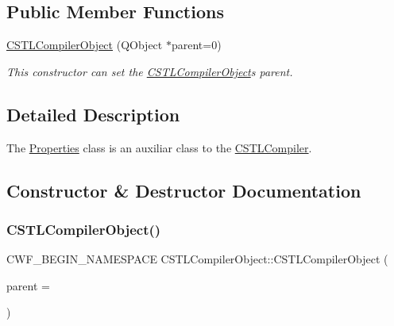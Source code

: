 \subsection*{Public Member Functions}
\begin{DoxyCompactItemize}
\item 
\mbox{\hyperlink{class_c_s_t_l_compiler_object_a31f110c6081112d484a85348520b0678}{C\+S\+T\+L\+Compiler\+Object}} (Q\+Object $\ast$parent=0)
\begin{DoxyCompactList}\small\item\em This constructor can set the \mbox{\hyperlink{class_c_s_t_l_compiler_object}{C\+S\+T\+L\+Compiler\+Object}}\textquotesingle{}s parent. \end{DoxyCompactList}\end{DoxyCompactItemize}


\subsection{Detailed Description}
The \mbox{\hyperlink{class_properties}{Properties}} class is an auxiliar class to the \mbox{\hyperlink{class_c_s_t_l_compiler}{C\+S\+T\+L\+Compiler}}. 

\subsection{Constructor \& Destructor Documentation}
\mbox{\label{class_c_s_t_l_compiler_object_a31f110c6081112d484a85348520b0678}} 
\subsubsection{\texorpdfstring{C\+S\+T\+L\+Compiler\+Object()}{CSTLCompilerObject()}}
{\footnotesize\ttfamily C\+W\+F\+\_\+\+B\+E\+G\+I\+N\+\_\+\+N\+A\+M\+E\+S\+P\+A\+CE C\+S\+T\+L\+Compiler\+Object\+::\+C\+S\+T\+L\+Compiler\+Object (\begin{DoxyParamCaption}\item[{Q\+Object $\ast$}]{parent = {} }\end{DoxyParamCaption})\hspace{0.3cm}{\ttfamily [explicit]}}




